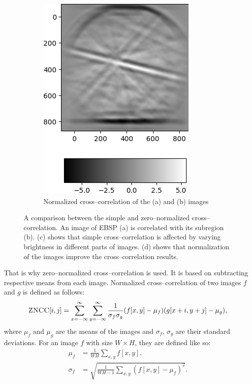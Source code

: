 \begin{figure}
\begin{subfigure}{.49\textwidth}
		\includegraphics[width=\linewidth]{img/normalized_corr}
		\caption{Normalized cross--correlation of the (a) and (b) images}
		\label{normalized-cross}
	\end{subfigure}
	
	\caption{A comparison between the simple and zero--normalized cross--correlation. An image of EBSP (a) is correlated with its subregion (b). (c) shows that simple cross--correlation is affected by varying brightness in different parts of images. (d) shows that normalization of the images improve the cross--correlation results.}
\end{figure}

That is why zero--normalized cross--correlation is used. It is based on subtracting respective means from each image. Normalized cross--correlation of two images $f$ and $g$ is defined as follows:
\[
\textsc{ZNCC}[i,j] = \sum_{x=-\infty}^{\infty}\sum_{y=-\infty}^{\infty} \frac{1}{\sigma_f \sigma_g}(f[x,y] - \mu_f)(g[x+i,y+j] - \mu_g),
\]  
where $\mu_f$ and $\mu_g$ are the means of the images and $\sigma_f$, $\sigma_g$ are their standard deviations. For an image $f$ with size $W \times H$, they are defined like so:
\begin{align*}
\mu_f &= \frac{1}{WH} \sum_{x,y}{}f[x,y], \\
\sigma_f &= \sqrt{\frac{1}{WH-1} \sum_{x,y}(f[x,y]-\mu_f)^2}.
\end{align*}

